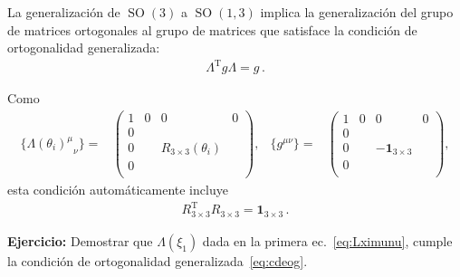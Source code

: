 La generalización de $\operatorname{SO}(3)$ a $\operatorname{SO}(1,3)$ implica la generalización del grupo de matrices ortogonales al grupo de matrices que satisface la condición de ortogonalidad generalizada:
\begin{align}
  \label{eq:cdeog}
  \Lambda^{\operatorname{T}} g \Lambda = g\,.
\end{align}

Como 
\begin{align}
   \{{\Lambda(\theta_i)^{\mu}}_{\nu}\}=&
  \begin{pmatrix}
    1 & 0 & 0& 0\\
    0 &   &  &  \\
    0 &   & R_{3\times3}(\theta_i)  &  \\
    0 &   &  &  \\
  \end{pmatrix},&
   \{g^{\mu\nu}\}=&
  \begin{pmatrix}
    1 & 0 & 0& 0\\
    0 &   &  &  \\
    0 &   & -\boldsymbol{1}_{3\times3}  &  \\
    0 &   &  &  \\
  \end{pmatrix},                  
\end{align}
esta condición automáticamente incluye
\begin{align}
  R_{3\times3}^{\operatorname{T}} R_{3\times3}=\boldsymbol{1}_{3\times3}\,.
\end{align}

\noindent
\textbf{Ejercicio:} Demostrar que $\Lambda(\xi_1)$ dada en la primera ec.~\eqref{eq:Lximunu},  cumple la condición de ortogonalidad generalizada~\eqref{eq:cdeog}.


